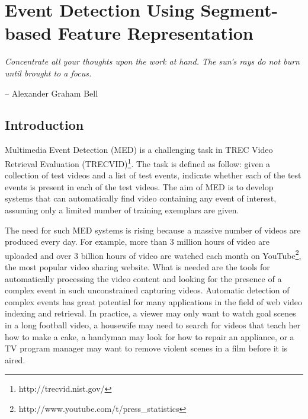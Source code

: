 
\chapter{Event Detection Using Segment-based Feature Representation}  %
\label{chapter3}
\epigraph{\textit{Concentrate all your thoughts upon the work at hand. The sun's rays do not burn until brought to a focus.}}{ -- Alexander Graham Bell}

\ifpdf
    \graphicspath{{Chapter3/Figs/Raster/}{Chapter3/Figs/PDF/}{Chapter3/Figs/}}
\else
    \graphicspath{{Chapter3/Figs/Vector/}{Chapter3/Figs/}}
\fi


\section{Introduction}
\label{introduction:1}
Multimedia Event Detection (MED) is a challenging task in TREC Video Retrieval Evaluation (TRECVID)\footnote{http://trecvid.nist.gov/}. The task is defined as follow: given a collection of test videos and a list of test events, indicate whether each of the test events is present in each of the test videos. The aim of MED is to develop systems that can automatically find video containing any event of interest, assuming only a limited number of training exemplars are given.



The need for such MED systems is rising because a massive number of videos are produced every day. For example, more than 3 million hours of video are uploaded and over 3 billion hours of video are watched each month on YouTube\footnote{http://www.youtube.com/t/press\_statistics}, the most popular video sharing website. What is needed are the tools for automatically processing the video content and looking for the presence of a complex event in such unconstrained capturing videos. Automatic detection of complex events has great potential for many applications in the field of web video indexing and retrieval. In practice, a viewer may only want to watch goal scenes in a long football video, a housewife may need to search for videos that teach her how to make a cake, a handyman may look for how to repair an appliance, or a TV program manager may want to remove violent scenes in a film before it is aired.

